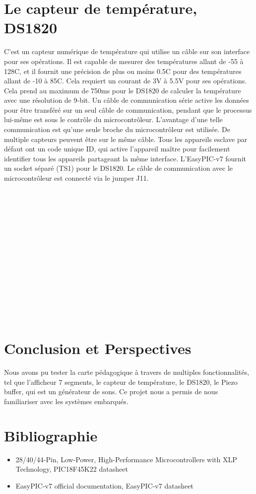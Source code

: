 \documentclass[a4paper, 12pt]{book}
\begin{document}
\chapter{Le capteur de température, DS1820}
C’est un capteur numérique de température qui utilise un câble sur son interface pour ses opérations. Il est capable de mesurer des températures allant de -55 à 128C, et il fournit une précision de plus ou moins 0.5C pour des températures allant de -10 à 85C. Cela requiert un courant de 3V à 5.5V pour ses opérations. Cela prend au maximum de 750ms pour le DS1820 de calculer la température avec une résolution de 9-bit.
Un câble de communication série active les données pour être transféré sur un seul câble de communication, pendant que le processus lui-même est sous le contrôle du microcontrôleur. L’avantage d’une telle communication est qu’une seule broche du microcontrôleur est utilisée. De multiple capteurs peuvent être sur le même câble. Tous les appareils esclave par défaut ont un code unique ID, qui active l’appareil maître pour facilement identifier tous les appareils partageant la même interface. L’EasyPIC-v7 fournit un socket séparé (TS1) pour le DS1820. Le câble de communication avec le microcontrôleur est connecté via le jumper J11.\\\\\\\\\\\\\\\\\\\\\\\\\\\\\\


\cite{redbook}

\chapter{Conclusion et Perspectives\label{chap-conclusion}}
Nous avons pu tester la carte pédagogique à travers de multiples fonctionnalités, tel que l'afficheur 7 segments, le capteur de température, le DS1820, le Piezo buffer, qui est un générateur de sons. 
Ce projet nous a permis de nous familiariser avec les systèmes embarqués.

\chapter{Bibliographie}
\begin{itemize}
\item 28/40/44-Pin, Low-Power, High-Performance Microcontrollers with XLP Technology, PIC18F45K22 datasheet
\item EasyPIC-v7 official documentation, EasyPIC-v7 datasheet
\end{itemize}



\end{document}
